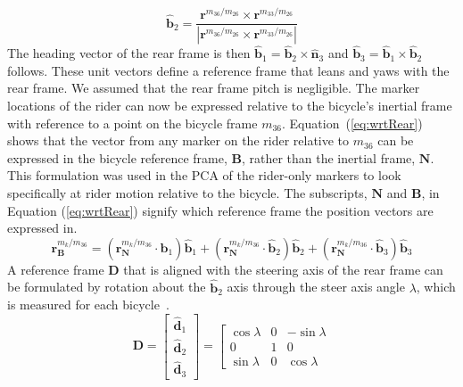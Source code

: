 \documentclass[smallextended]{svjour3}     %
\begin{document}
\begin{appendices}
\begin{equation}
\hat{\mathbf{b}}_2=
\frac{\mathbf{r}^{{m_{36}}/m_{26}}\times\mathbf{r}^{{m_{33}}/m_{26}}}
{|\mathbf{r}^{{m_{36}}/m_{26}}\times\mathbf{r}^{{m_{33}}/m_{26}}|}
\label{eq:b2}
\end{equation}
The heading vector of the rear frame is then
$\hat{\mathbf{b}}_1=\hat{\mathbf{b}}_2\times\hat{\mathbf{n}}_3$ and
$\hat{\mathbf{b}}_3=\hat{\mathbf{b}}_1\times\hat{\mathbf{b}}_2$ follows. These
unit vectors define a reference frame that leans and yaws with the rear frame.
We assumed that the rear frame pitch is negligible. The marker locations of the
rider can now be expressed relative to the bicycle's inertial frame with reference to a point
on the bicycle frame $m_{36}$. Equation~(\ref{eq:wrtRear}) shows that the vector from
any marker on the rider relative to $m_{36}$ can be expressed in the bicycle
reference frame, $\mathbf{B}$, rather than the inertial frame, $\mathbf{N}$.
This formulation was used in the
PCA of the rider-only markers to look specifically at rider motion relative to
the bicycle. The subscripts, $\mathbf{N}$ and $\mathbf{B}$, in Equation
(\ref{eq:wrtRear}) signify which
reference frame the position vectors are expressed in.
\begin{equation}
    \mathbf{r}^{{m_{k}}/m_{36}}_\mathbf{B}=
    (\mathbf{r}^{{m_{k}}/m_{36}}_\mathbf{N}\cdot\hat{\mathbf{b}}_1)\hat{\mathbf{b}}_1+
    (\mathbf{r}^{{m_{k}}/m_{36}}_\mathbf{N}\cdot\hat{\mathbf{b}}_2)\hat{\mathbf{b}}_2+
    (\mathbf{r}^{{m_{k}}/m_{36}}_\mathbf{N}\cdot\hat{\mathbf{b}}_3)\hat{\mathbf{b}}_3
\label{eq:wrtRear}
\end{equation}
A reference frame $\mathbf{D}$ that is aligned with the steering axis of the
rear frame can be formulated by rotation about the $\hat{\mathbf{b}}_2$ axis
through the steer axis angle $\lambda$, which is measured for each
bicycle~\cite{Moore2009a}.
\begin{equation}
    \mathbf{D}=
    \left[
    \begin{array}{c}
    \hat{\mathbf{d}}_1\\
    \hat{\mathbf{d}}_2\\
    \hat{\mathbf{d}}_3
  \end{array}
    \right]
    =
    \left[
    \begin{array}{rrr}
    \cos{\lambda} &  0 &  -\sin{\lambda}\\
    0             &  1 &  0\\
    \sin{\lambda} &  0 & \cos{\lambda}
    \end{array}

\end{equation}
\end{appendices}
\end{document}
